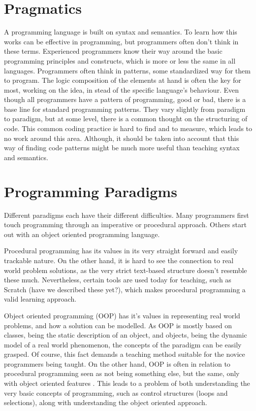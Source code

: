 \section{Pragmatics}
A programming language is built on syntax and semantics. To learn how this works can be effective in programming, but programmers often don't think in these terms. Experienced programmers know their way around the basic programming principles and constructs, which is more or less the same in all languages. Programmers often think in patterns, some standardized way for them to program. The logic composition of the elements at hand is often the key for most, working on the idea, in stead of the specific language's behaviour. Even though all programmers have a pattern of programming, good or bad, there is a base line for standard programming patterns. They vary slightly from paradigm to paradigm, but at some level, there is a common thought on the structuring of code. This common coding practice is hard to find and to measure, which leads to no  work around this area. Although, it should be taken into account that this way of finding code patterns might be much more useful than teaching syntax and semantics.


\section{Programming Paradigms}
Different paradigms each have their different difficulties. Many programmers first touch programming through an imperative or procedural approach. Others start out with an object oriented programming language. 

Procedural programming has its values in its very straight forward and easily trackable nature. On the other hand, it is hard to see the connection to real world problem solutions, as the very strict text-based structure doesn't resemble these much. Nevertheless, certain tools are used today for teaching, such as Scratch (have we described these yet?), which makes procedural programming a valid learning approach.

Object oriented programming (OOP) has it's values in representing real world problems, and how a solution can be modelled. As OOP is mostly based on classes, being the static description of an object, and objects, being the dynamic model of a real world phenomenon, the concepts of the paradigm can be easily grasped. Of course, this fact demands a teaching method suitable for the novice programmers being taught. On the other hand, OOP is often in relation to procedural programming seen as not being something else, but the same, only with object oriented features \cite{Garner05}. This leads to a problem of both understanding the very basic concepts of programming, such as control structures (loops and selections), along with understanding the object oriented approach.

